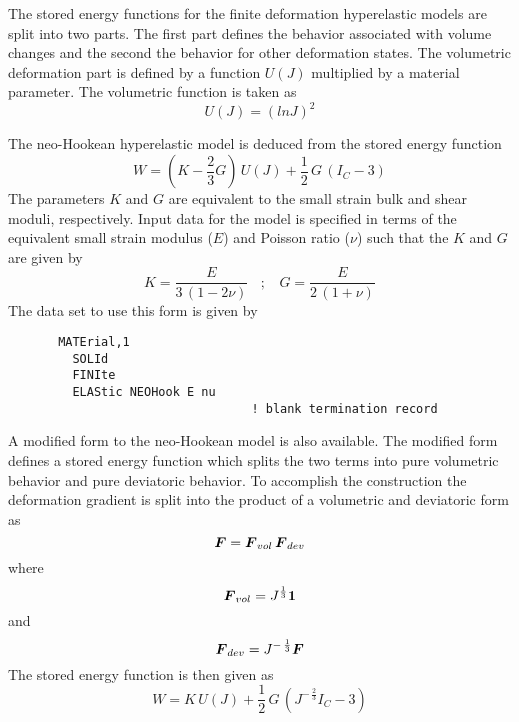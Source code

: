 The stored energy functions for the finite deformation hyperelastic models
are split into two parts.  The first part defines the behavior associated
with volume changes and the second the behavior for other deformation states.
The volumetric deformation part is defined by a function $U(J)$ multiplied
by a material parameter.  The volumetric function is taken as
\begin{equation}
U(J) = \left( ln J \right)^2
\end{equation}

The neo-Hookean hyperelastic model is deduced from the stored energy function
\begin{equation}
W = \left( K  - \frac{2}{3} G \right) \, U(J)
+ \frac{1}{2} \, G \, \left( I_C - 3 \right)
\end{equation}
The parameters $K$ and $G$ are equivalent to the small strain bulk and shear
moduli, respectively.  Input data for the model is specified in terms of
the equivalent small strain modulus ($E$) and Poisson ratio ($\nu$) such that
the $K$ and $G$ are given by
\begin{equation}
\label{enu}
K = \frac{E}{3 \, ( 1 - 2 \nu )} ~~~~;~~~~ G = \frac{E}{2 \, ( 1 + \nu )}
\end{equation}
The data set to use this form is given by
\begin{verbatim}
       MATErial,1
         SOLId
         FINIte
         ELAStic NEOHook E nu
                                  ! blank termination record
\end{verbatim}

A modified form to the neo-Hookean model is also available.  The modified
form defines a stored energy function which splits the two terms into
pure volumetric behavior and pure deviatoric behavior.  To accomplish
the construction the deformation gradient is split into the product of
a volumetric and deviatoric form as
\begin{equation}
\boldsymbol{F} = \boldsymbol{F}_{vol} \, \boldsymbol{F}_{dev}
\end{equation}
where
\begin{equation}
\boldsymbol{F}_{vol} = J^\frac{1}{3} \boldsymbol{1}
\end{equation}
and
\begin{equation}
\boldsymbol{F}_{dev} =  {J}^{- \, \frac{1}{3}} \boldsymbol{F}
\end{equation}
The stored energy function is then given as
\begin{equation}
W = K  \, U(J)
+ \frac{1}{2} \, G \, \left( {J}^{- \, \frac{2}{3}} I_C - 3 \right)
\end{equation}

